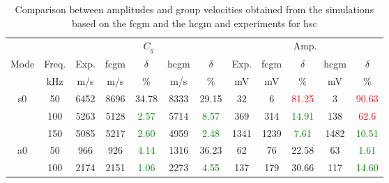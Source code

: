 \begin{table}[!htb]
	\small
	\tabcolsep=0.15cm
	\centering
	\caption{\label{tab:group_velocity_hsc} Comparison between amplitudes and group velocities obtained from the simulations based on the \acf{fcgm} and the \acf{hcgm} and experiments for \acl{hsc}}
	\begin{tabular}{cccccccccccc}
		\toprule
		& & \multicolumn{5}{c}{\(C_g\)} & \multicolumn{5}{c}{Amp.}\\
		Mode & Freq.& Exp. & \ac{fcgm} & \(\delta\) & \ac{hcgm} & \(\delta\) &  Exp. & \ac{fcgm} & \(\delta\) & \ac{hcgm} & \(\delta\)\\
		& \unit{\kHz} & \unit[per-mode = symbol]{\m\per\s} & \unit[per-mode = symbol]{\m\per\s} & \% & \unit[per-mode = symbol]{\m\per\s} & \% & \unit{\mV} & \unit{\mV} & \%& \unit{\mV} & \% \\
		\midrule
		\multirow{3}{*}{\ac{s0}} & 50 & 6452 & 8696 & {34.78} & 8333 & {29.15} & 32 & 6 & \textcolor{red}{81.25} & 3 & \textcolor{red}{90.63}\\
		&100& 5263 & 5128 & \textcolor{green}{2.57} & 5714 & \textcolor{green}{8.57} & 369 & 314 & \textcolor{green}{14.91} & 138 & \textcolor{red}{62.6}\\
		&150& 5085 & 5217 & \textcolor{green}{2.60} & 4959 & \textcolor{green}{2.48} & 1341 & 1239 & \textcolor{green}{7.61} & 1482 & \textcolor{green}{10.51}\\
		\midrule
		\multirow{2}{*}{\ac{a0}} & 50 & 966 & 926 & \textcolor{green}{4.14} & 1316 & {36.23} & 62 & 76 & {22.58} & 63 & \textcolor{green}{1.61}\\
		& 100 & 2174 & 2151 & \textcolor{green}{1.06} & 2273 & \textcolor{green}{4.55} & 137 & 179 & {30.66} & 117 & \textcolor{green}{14.60}\\
		\bottomrule
	\end{tabular}
\end{table}